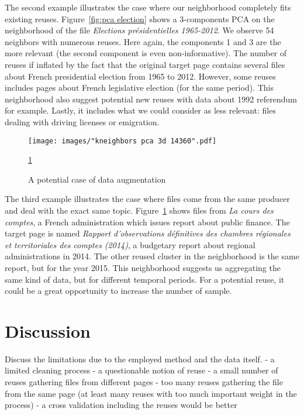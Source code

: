 \documentclass[a4paper]{article}
\begin{document}
	The second example illustrates the case where our neighborhood completely fits existing reuses. Figure~\ref{fig:pca election} shows a 3-components PCA on the neighborhood of the file \emph{Elections présidentielles 1965-2012}. We observe 54 neighbors with numerous reuses. Here again, the components 1 and 3 are the more relevant (the second component is even non-informative). The number of reuses if inflated by the fact that the original target page contains several files about French presidential election from 1965 to 2012. However, some reuses includes pages about French legislative election (for the same period). This neighborhood also suggest potential new reuses with data about 1992 referendum for example. Lastly, it includes what we could consider as less relevant: files dealing with driving licenses or emigration.

	\begin{figure}[]
		\texttt{[image: images/"kneighbors pca 3d 14360".pdf]}
		\caption{A potential case of data augmentation}
		\label{fig:pca compte}
		\ref{fig:pca compte}
	\end{figure}

	The third example illustrates the case where files come from the same producer and deal with the exact same topic. Figure~\ref{fig:pca compte} shows files from \emph{La cours des comptes}, a French administration which issues report about public finance. The target page is named \emph{Rapport d'observations définitives des chambres régionales et territoriales des comptes (2014)}, a budgetary report about regional administrations in 2014. The other reused cluster in the neighborhood is the same report, but for the year 2015. This neighborhood suggests us aggregating the same kind of data, but for different temporal periods. For a potential reuse, it could be a great opportunity to increase the number of sample. 
	
	\section{Discussion}
	
	Discuss the limitations due to the employed method and the data itself. 
	- a limited cleaning process
	- a questionable notion of reuse
	- a small number of reuses gathering files from different pages
	- too many reuses gathering the file from the same page (at least many reuses with too much important weight in the process)
	- a cross validation including the reuses would be better
	
\end{document}
